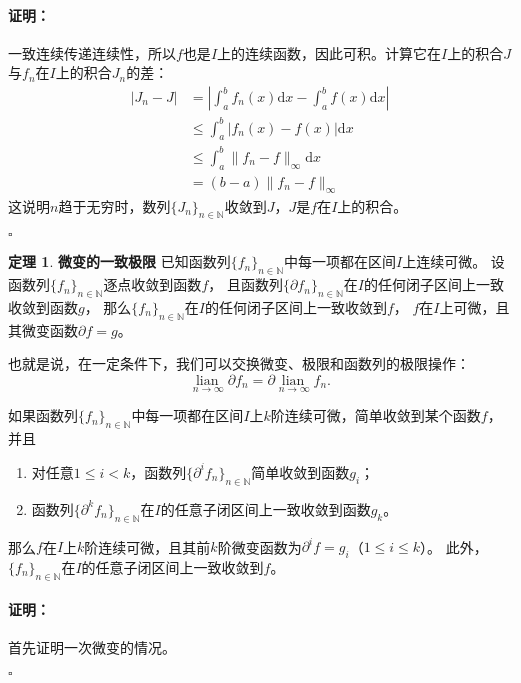 \documentclass[12pt,UTF8]{ctexbook}
\newcommand{\lian}[1]{
    \underset{#1}{\operatorname{lian}\,}
}
\theoremstyle{definition}
\newtheorem{tm}{定理}[section]
\theoremstyle{plain}
\renewenvironment{proof}{\paragraph{\textbf{证明：}}}{\hfill$\square$}
\begin{document}
\begin{appendix}
\begin{proof}
    一致连续传递连续性，所以$f$也是$I$上的连续函数，因此可积。计算它在$I$上的积合$J$与$f_n$在$I$上的积合$J_n$的差：
    \begin{align*}
        |J_n - J| &= \left|\int_a^b f_n(x)\mathrm{d}x - \int_a^b f(x)\mathrm{d}x \right| \\
        &\leqslant \int_a^b \left| f_n(x) - f(x)\right| \mathrm{d}x \\
        &\leqslant \int_a^b \| f_n - f\|_{\infty} \mathrm{d}x \\
        &= (b - a) \| f_n - f\|_{\infty}
    \end{align*}
    这说明$n$趋于无穷时，数列$\{J_n\}_{n\in\mathbb{N}}$收敛到$J$，$J$是$f$在$I$上的积合。

\end{proof}

\begin{tm}{\textbf{微变的一致极限}}
    已知函数列$\{f_n\}_{n\in\mathbb{N}}$中每一项都在区间$I$上连续可微。
    设函数列$\{f_n\}_{n\in\mathbb{N}}$逐点收敛到函数$f$，
    且函数列$\{\partial f_n\}_{n\in\mathbb{N}}$在$I$的任何闭子区间上一致收敛到函数$g$，
    那么$\{f_n\}_{n\in\mathbb{N}}$在$I$的任何闭子区间上一致收敛到$f$，
    $f$在$I$上可微，且其微变函数$\partial f = g$。

    也就是说，在一定条件下，我们可以交换微变、极限和函数列的极限操作：
    $$ \lian{n\to \infty} \partial f_n = \partial \lian{n\to \infty} f_n. $$

    如果函数列$\{f_n\}_{n\in\mathbb{N}}$中每一项都在区间$I$上$k$阶连续可微，简单收敛到某个函数$f$，并且
    \begin{enumerate}
        \item 对任意$1 \leqslant i < k$，函数列$\{\partial^i f_n\}_{n\in\mathbb{N}}$简单收敛到函数$g_i$；
        \item 函数列$\{\partial^k f_n\}_{n\in\mathbb{N}}$在$I$的任意子闭区间上一致收敛到函数$g_k$。
    \end{enumerate}
    那么$f$在$I$上$k$阶连续可微，且其前$k$阶微变函数为$\partial^i f = g_i$（$1 \leqslant i\leqslant k$）。
    此外，$\{f_n\}_{n\in\mathbb{N}}$在$I$的任意子闭区间上一致收敛到$f$。

\end{tm}

\begin{proof}
    首先证明一次微变的情况。
    

\end{proof}
\end{appendix}
\end{document}
